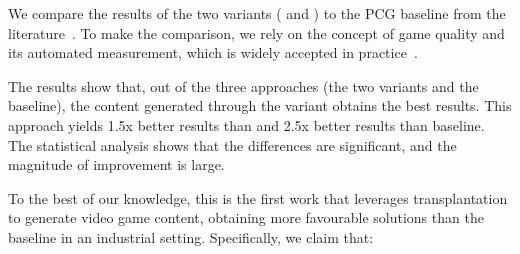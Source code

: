 We compare the results of the two \ApproachName{} variants (\timhotep{} and \simhotep{}) to the PCG baseline from the literature~\cite{gallotta2022evolving}. To make the comparison, we rely on the concept of game quality and its automated measurement, which is widely accepted in practice~\cite{browne2010evolutionary}. 

The results show that, out of the three approaches (the two \ApproachName{} variants and the baseline), the content generated through the \simhotep{} variant obtains the best results. This approach yields 1.5x better results than \timhotep{} and 2.5x better results than baseline. The statistical analysis shows that the differences are significant, and the magnitude of improvement is large.

To the best of our knowledge, this is the first work that leverages transplantation to generate video game content, obtaining more favourable solutions than the baseline in an industrial setting. Specifically, we claim that:

